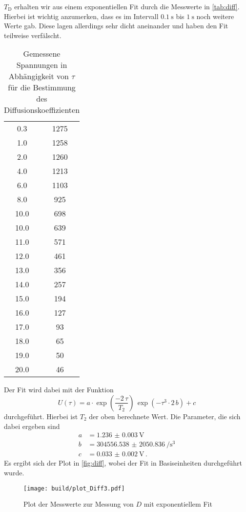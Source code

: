 $T_\text{D}$ erhalten wir aus einem exponentiellen Fit durch die Messwerte in \autoref{tab:diff}.
Hierbei ist wichtig anzumerken, dass es im Intervall $\SI{0.1}{\second}$ bis $\SI{1}{\second}$ noch weitere Werte gab.
Diese lagen allerdings sehr dicht aneinander und haben den Fit teilweise verfälscht.

\begin{table}
    \centering
    \caption{Gemessene Spannungen in Abhängigkeit von $\tau$ für die Bestimmung des Diffusionskoeffizienten}
    \label{tab:diff}
    \begin{tabular}{S[table-format=2.1] S[table-format=4.0]}
        \toprule
        \tableSI{\tau}{\milli\second} &   \\
         & 1275 \\
        1.0 & 1258 \\
        2.0 & 1260 \\
        4.0 & 1213 \\
        6.0 & 1103 \\
        8.0 & 925 \\
        10.0 & 698 \\
        10.0 & 639 \\
        11.0 & 571 \\
        12.0 & 461 \\
        13.0 & 356 \\
        14.0 & 257 \\
        15.0 & 194 \\
        16.0 & 127 \\
        17.0 & 93 \\
        18.0 & 65 \\
        19.0 & 50 \\
        20.0 & 46 \\
        \bottomrule
    \end{tabular}
\end{table}

Der Fit wird dabei mit der Funktion 
\begin{equation}
    U(\tau) = a \cdot \exp(\frac{- 2\,  \tau}{T_2}) \, \exp(- \tau ^3 \cdot 2 \, b) + c 
    \label{eq:fit_d}
\end{equation}
durchgeführt.
Hierbei ist $T_2$ der oben berechnete Wert.
Die Parameter, die sich dabei ergeben sind 
\begin{align*}
    a &= \SI{1.236(3)}{\volt} \\
    b &= \SI{304556.538(2050836)}{\per\cubic\second} \\
    c &= \SI{0.033(2)}{\volt} \, .
\end{align*}
Es ergibt sich der Plot in \autoref{fig:diff}, wobei der Fit in Basiseinheiten durchgeführt wurde.
\begin{figure}
    \centering
    \texttt{[image: build/plot\_Diff3.pdf]}
    \caption{Plot der Messwerte zur Messung von $D$ mit exponentiellem Fit}
    \label{fig:diff}
\end{figure}

